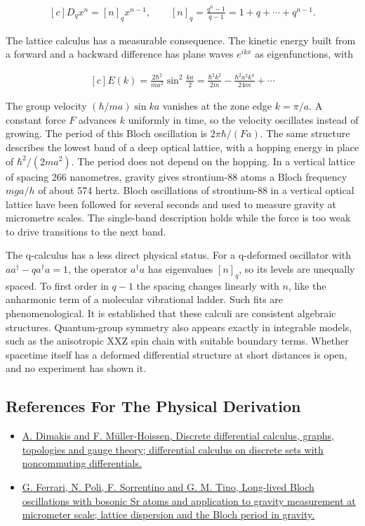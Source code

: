 \documentclass[11pt,oneside]{book}
\newenvironment{centeredalign}{\[\begin{gathered}[c]}{\end{gathered}\]}
\begin{document}
\begin{centeredalign}
D_qx^n=[n]_qx^{n-1},\qquad [n]_q=\frac{q^n-1}{q-1}=1+q+\cdots+q^{n-1}.
\end{centeredalign}

The lattice calculus has a measurable consequence. The kinetic energy built from a forward and a backward difference has plane waves \(e^{ikx}\) as eigenfunctions, with

\begin{centeredalign}
E(k)=\frac{2\hbar^2}{ma^2}\sin^2\frac{ka}{2}
=\frac{\hbar^2k^2}{2m}-\frac{\hbar^2a^2k^4}{24m}+\cdots
\end{centeredalign}

The group velocity \((\hbar/ma)\sin ka\) vanishes at the zone edge \(k=\pi/a\). A constant force \(F\) advances \(k\) uniformly in time, so the velocity oscillates instead of growing. The period of this Bloch oscillation is \(2\pi\hbar/(Fa)\). The same structure describes the lowest band of a deep optical lattice, with a hopping energy in place of \(\hbar^2/(2ma^2)\). The period does not depend on the hopping. In a vertical lattice of spacing 266 nanometres, gravity gives strontium-88 atoms a Bloch frequency \(mga/h\) of about 574 hertz. Bloch oscillations of strontium-88 in a vertical optical lattice have been followed for several seconds and used to measure gravity at micrometre scales. The single-band description holds while the force is too weak to drive transitions to the next band.

The q-calculus has a less direct physical status. For a q-deformed oscillator with \(aa^\dagger-qa^\dagger a=1\), the operator \(a^\dagger a\) has eigenvalues \([n]_q\), so its levels are unequally spaced. To first order in \(q-1\) the spacing changes linearly with \(n\), like the anharmonic term of a molecular vibrational ladder. Such fits are phenomenological. It is established that these calculi are consistent algebraic structures. Quantum-group symmetry also appears exactly in integrable models, such as the anisotropic XXZ spin chain with suitable boundary terms. Whether spacetime itself has a deformed differential structure at short distances is open, and no experiment has shown it.

\subsection*{References For The Physical Derivation}
\begin{itemize}
\item \href{https://arxiv.org/abs/hep-th/9404112}{A. Dimakis and F. Müller-Hoissen, Discrete differential calculus, graphs, topologies and gauge theory; differential calculus on discrete sets with noncommuting differentials.}
\item \href{https://arxiv.org/abs/physics/0605018}{G. Ferrari, N. Poli, F. Sorrentino and G. M. Tino, Long-lived Bloch oscillations with bosonic Sr atoms and application to gravity measurement at micrometer scale; lattice dispersion and the Bloch period in gravity.}
\end{itemize}
\end{document}
